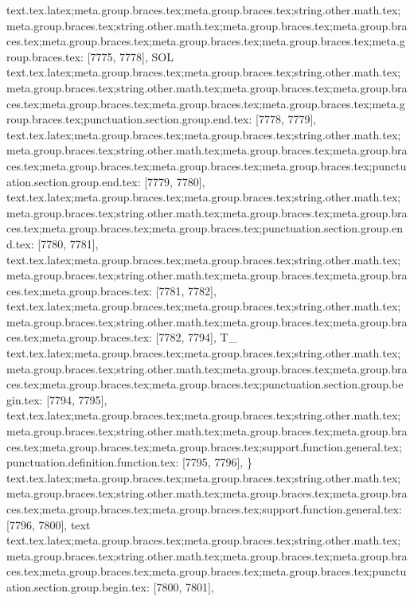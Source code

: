 {{{{{{{{{{{{{{{{{{{{{{{{{{{{{{{{{{{{{{{{{{{{{{{{{{{{{{{{{{{{{{{{{{{{{{{{{{{{{{{{{{{{{{{{{{{{{{{{{{{{{{{{{{{{{{{{{{{{{{{{{{{{{{{{{{{{{{{{{{{{{{{{{{{{{{{{{{{{{{{{{{{{{{{{{{{{{{{{{{{{{{{{{{{{{{{{{{{{{{{{{{{{{{{{{{{{{{{{{{{{{{{{{{{{{{{{{text.tex.latex;meta.group.braces.tex;meta.group.braces.tex;string.other.math.tex;meta.group.braces.tex;string.other.math.tex;meta.group.braces.tex;meta.group.braces.tex;meta.group.braces.tex;meta.group.braces.tex;meta.group.braces.tex;meta.group.braces.tex: [7775, 7778], {SOL}
text.tex.latex;meta.group.braces.tex;meta.group.braces.tex;string.other.math.tex;meta.group.braces.tex;string.other.math.tex;meta.group.braces.tex;meta.group.braces.tex;meta.group.braces.tex;meta.group.braces.tex;meta.group.braces.tex;meta.group.braces.tex;punctuation.section.group.end.tex: [7778, 7779], {}}
text.tex.latex;meta.group.braces.tex;meta.group.braces.tex;string.other.math.tex;meta.group.braces.tex;string.other.math.tex;meta.group.braces.tex;meta.group.braces.tex;meta.group.braces.tex;meta.group.braces.tex;meta.group.braces.tex;punctuation.section.group.end.tex: [7779, 7780], {}}
text.tex.latex;meta.group.braces.tex;meta.group.braces.tex;string.other.math.tex;meta.group.braces.tex;string.other.math.tex;meta.group.braces.tex;meta.group.braces.tex;meta.group.braces.tex;meta.group.braces.tex;punctuation.section.group.end.tex: [7780, 7781], {}}
text.tex.latex;meta.group.braces.tex;meta.group.braces.tex;string.other.math.tex;meta.group.braces.tex;string.other.math.tex;meta.group.braces.tex;meta.group.braces.tex;meta.group.braces.tex: [7781, 7782], {
}
text.tex.latex;meta.group.braces.tex;meta.group.braces.tex;string.other.math.tex;meta.group.braces.tex;string.other.math.tex;meta.group.braces.tex;meta.group.braces.tex;meta.group.braces.tex: [7782, 7794], {          T_}
text.tex.latex;meta.group.braces.tex;meta.group.braces.tex;string.other.math.tex;meta.group.braces.tex;string.other.math.tex;meta.group.braces.tex;meta.group.braces.tex;meta.group.braces.tex;meta.group.braces.tex;punctuation.section.group.begin.tex: [7794, 7795], {{}
text.tex.latex;meta.group.braces.tex;meta.group.braces.tex;string.other.math.tex;meta.group.braces.tex;string.other.math.tex;meta.group.braces.tex;meta.group.braces.tex;meta.group.braces.tex;meta.group.braces.tex;support.function.general.tex;punctuation.definition.function.tex: [7795, 7796], {\}
text.tex.latex;meta.group.braces.tex;meta.group.braces.tex;string.other.math.tex;meta.group.braces.tex;string.other.math.tex;meta.group.braces.tex;meta.group.braces.tex;meta.group.braces.tex;meta.group.braces.tex;support.function.general.tex: [7796, 7800], {text}
text.tex.latex;meta.group.braces.tex;meta.group.braces.tex;string.other.math.tex;meta.group.braces.tex;string.other.math.tex;meta.group.braces.tex;meta.group.braces.tex;meta.group.braces.tex;meta.group.braces.tex;meta.group.braces.tex;punctuation.section.group.begin.tex: [7800, 7801], {{}
}}}}}}}}}}}}}}}}}}}}}}}}}}}}}}}}}}}}}}}}}}}}}}}}}}}}}}}}}}}}}}}}}}}}}}}}}}}}}}}}}}}}}}}}}}}}}}}}}}}}}}}}}}}}}}}}}}}}}}}}}}}}}}}}}}}}}}}}}}}}}}}}}}}}}}}}}}}}}}}}}}}}}}}}}}}}}}}}}}}}}}}}}}}}}}}}}}}}}}}}}}}}}}}}}}}}}}}}}}}}}}}}}}}}}}}}}
